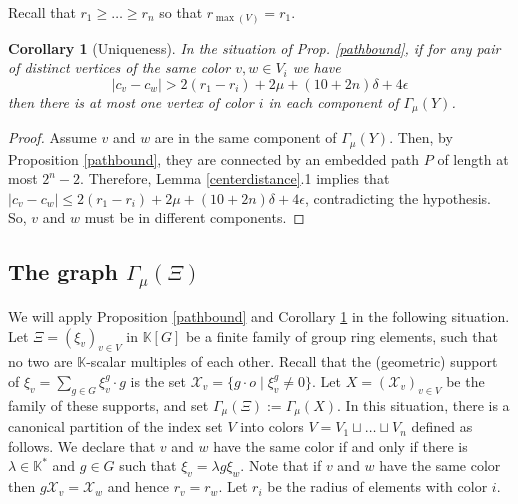 \documentclass[11pt,letterpaper]{amsart}
\newtheorem{corollary}[theorem]{Corollary}
\begin{document}
Recall that $r_1\geq\dots\geq r_n$ so that $r_{\max(V)}=r_1$.%
\begin{corollary}[Uniqueness]
\label{uniqueness}
In the situation of Prop. \ref{pathbound}, if for any pair of distinct vertices of the same color $v,w\in V_i$ we have 
$$
|c_v-c_w|>2(r_{1}-r_i)+2\mu+(10+2n)\delta+4\epsilon
$$
then there is at most one vertex of color $i$ in each component of $\Gamma_{\mu}(Y)$. %
\end{corollary}
\begin{proof}
Assume $v$ and $w$ are in the same component of $\Gamma_{\mu}(Y)$. Then, by Proposition \ref{pathbound}, they are connected by an embedded path $P$ of length at most $2^{n}-2$. Therefore, Lemma \ref{centerdistance}.1 implies that $|c_v-c_w|\leq 2(r_{1}-r_i)+2\mu+(10+2n)\delta+4\epsilon$, contradicting the hypothesis. So, $v$ and $w$ must be in different components. 
\end{proof}





\subsection{The graph $\Gamma_{\mu}(\Xi)$} We will apply Proposition \ref{pathbound} and Corollary \ref{uniqueness} in the following situation. 
Let $\Xi=(\xi_v)_{v\in V}$ in $\mathbb K[G]$ be a finite family of group ring elements, such that no two are $\mathbb K$-scalar multiples of each other. 
Recall that the (geometric) support of $\xi_v=\sum_{g\in G}\xi_v^g\cdot g$ is the set $\mathcal X_v=\{g\cdot o\mid \xi_v^g\not=0\}$. 
Let $X=(\mathcal X_v)_{v\in V}$ be the family of these supports, and set $\Gamma_{\mu}(\Xi):=\Gamma_{\mu}(X)$. In this situation, there is a canonical partition of the index set $V$ into colors $V=V_1\sqcup\dots\sqcup V_n$ defined as follows. We declare that $v$ and $w$ have the same color if and only if there is $\lambda\in\mathbb K^*$ and $g\in G$ such that $\xi_v=\lambda g\xi_w$. Note that if $v$ and $w$ have the same color then $g\mathcal X_v=\mathcal X_w$ and hence $r_v=r_w$. Let $r_i$ be the radius of elements with color $i$. 
\end{document}
